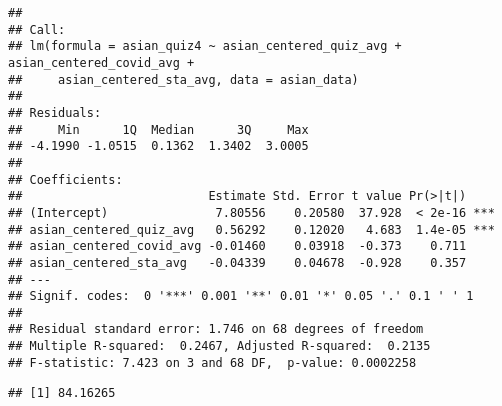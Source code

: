 \documentclass[
]{article}
\begin{document}
\begin{verbatim}
## 
## Call:
## lm(formula = asian_quiz4 ~ asian_centered_quiz_avg + asian_centered_covid_avg + 
##     asian_centered_sta_avg, data = asian_data)
## 
## Residuals:
##     Min      1Q  Median      3Q     Max 
## -4.1990 -1.0515  0.1362  1.3402  3.0005 
## 
## Coefficients:
##                          Estimate Std. Error t value Pr(>|t|)    
## (Intercept)               7.80556    0.20580  37.928  < 2e-16 ***
## asian_centered_quiz_avg   0.56292    0.12020   4.683  1.4e-05 ***
## asian_centered_covid_avg -0.01460    0.03918  -0.373    0.711    
## asian_centered_sta_avg   -0.04339    0.04678  -0.928    0.357    
## ---
## Signif. codes:  0 '***' 0.001 '**' 0.01 '*' 0.05 '.' 0.1 ' ' 1
## 
## Residual standard error: 1.746 on 68 degrees of freedom
## Multiple R-squared:  0.2467, Adjusted R-squared:  0.2135 
## F-statistic: 7.423 on 3 and 68 DF,  p-value: 0.0002258
\end{verbatim}

\begin{verbatim}
## [1] 84.16265
\end{verbatim}
\end{document}

